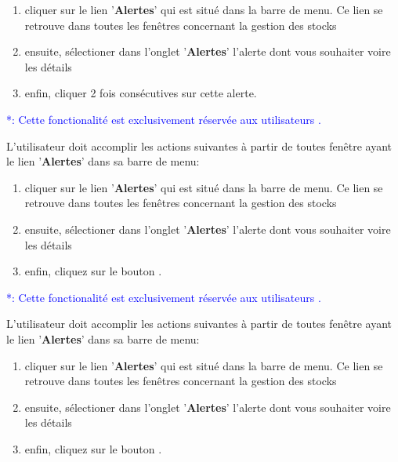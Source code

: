 \begin{enumerate}[1)]
	\item cliquer sur le lien '\textbf{Alertes}' qui est situ\'e
	dans la barre de menu. Ce lien se retrouve dans toutes les
	fen\^etres concernant la gestion des stocks
		
	\item ensuite, s\'electioner dans l'onglet '\textbf{Alertes}'
		l'alerte dont vous souhaiter voire les d\'etails

	\item enfin, cliquer 2 fois cons\'ecutives sur cette alerte.	
\end{enumerate}



\textcolor{blue}{*: Cette fonctionalit\'e est exclusivement
	r\'eserv\'ee aux utilisateurs \patron.}

L'utilisateur doit accomplir les actions suivantes \`a
partir de toutes fen\^etre ayant le lien '\textbf{Alertes}'
dans sa barre de menu:

\begin{enumerate}[1)]
	\item cliquer sur le lien '\textbf{Alertes}' qui est situ\'e
	dans la barre de menu. Ce lien se retrouve dans toutes les
	fen\^etres concernant la gestion des stocks
		
	\item ensuite, s\'electioner dans l'onglet '\textbf{Alertes}'
		l'alerte dont vous souhaiter voire les d\'etails

	\item enfin, cliquez sur le bouton .	
\end{enumerate}

\newpage
{}

\textcolor{blue}{*: Cette fonctionalit\'e est exclusivement
		r\'eserv\'ee aux utilisateurs \patron.}

L'utilisateur doit accomplir les actions suivantes \`a
partir de toutes fen\^etre ayant le lien '\textbf{Alertes}'
dans sa barre de menu:

\begin{enumerate}[1)]
	\item cliquer sur le lien '\textbf{Alertes}' qui est situ\'e
	dans la barre de menu. Ce lien se retrouve dans toutes les
	fen\^etres concernant la gestion des stocks
		
	\item ensuite, s\'electioner dans l'onglet '\textbf{Alertes}'
		l'alerte dont vous souhaiter voire les d\'etails

	\item enfin, cliquez sur le bouton .
\end{enumerate}
